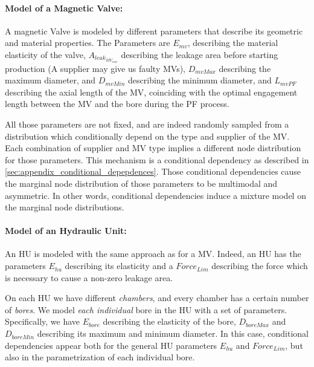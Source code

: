 \paragraph{Model of a Magnetic Valve:}
A magnetic Valve is modeled by different parameters that describe its geometric and material properties. 
The Parameters are $E_{mv}$, describing the material elasticity of the valve, $A_{leak_{MV_{raw}}}$ describing the leakage area before starting production (A supplier may give us faulty MVs), $D_{mvMax}$ describing the maximum diameter, and $D_{mvMin}$ describing the minimum diameter, and $L_{mvPF}$ describing the axial length of the MV, coinciding with the optimal engagement length between the MV and the bore during the PF process.

All those parameters are not fixed, and are indeed randomly sampled from a distribution which conditionally depend on the type and supplier of the MV. Each combination of supplier and MV type implies a different node distribution for those parameters. This mechanism is a conditional dependency as described in \ref{sec:appendix_conditional_depepdences}. Those conditional dependencies cause the marginal node distribution of those parameters to be multimodal and asymmetric. In other words, conditional dependencies induce a mixture model on the marginal node distributions.

\paragraph{Model of an Hydraulic Unit:}
An HU is modeled with the same approach as for a MV. Indeed, an HU has the parameters $E_{hu}$ describing its elasticity and a $Force_{Lim}$ describing the force which is necessary to cause a non-zero leakage area.

On each HU we have different \textit{chambers}, and every chamber has a certain number of \textit{bores}. We model \textit{each individual} bore in the HU with a set of parameters. Specifically, we have $E_{bore}$ describing the elasticity of the bore, $D_{boreMax}$ and $D_{boreMin}$ describing its maximum and minimum diameter.
In this case, conditional dependencies appear both for the general HU parameters $E_{hu}$ and $Force_{Lim}$, but also in the parametrization of each individual bore. 

